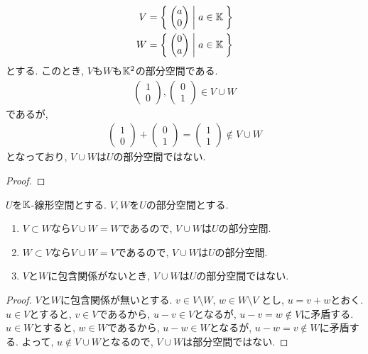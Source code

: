 \begin{example}
  \label{subspace:nonexample:cup}
  \begin{align*}
    V&=\Set{\begin{pmatrix}a\\0\end{pmatrix}|a\in\mathbb{K}}\\
    W&=\Set{\begin{pmatrix}0\\a\end{pmatrix}|a\in\mathbb{K}}
  \end{align*}
  とする.
  このとき, $V$も$W$も$\mathbb{K}^2$の部分空間である.
  \begin{align*}
    \begin{pmatrix}1\\0\end{pmatrix},
    \begin{pmatrix}0\\1\end{pmatrix}\in V\cup W
  \end{align*}
  であるが,
  \begin{align*}
    \begin{pmatrix}1\\0\end{pmatrix}+
    \begin{pmatrix}0\\1\end{pmatrix}=\begin{pmatrix}1\\1\end{pmatrix}\not\in V\cup W
  \end{align*}
  となっており, $V\cup W$は$U$の部分空間ではない.
\end{example}
\begin{proof}\end{proof}

\begin{example}
  $U$を$\mathbb{K}$-線形空間とする.
  $V, W$を$U$の部分空間とする.
  \begin{enumerate}
    \item $V\subset W$なら$V\cup W=W$であるので, $V\cup W$は$U$の部分空間.
    \item $W\subset V$なら$V\cup W=V$であるので, $V\cup W$は$U$の部分空間.
    \item $V$と$W$に包含関係がないとき, $V\cup W$は$U$の部分空間ではない. 
  \end{enumerate}
\end{example}
\begin{proof}
  $V$と$W$に包含関係が無いとする.
  $v\in V\setminus W$, $w\in W\setminus V$
  とし, $u=v+w$とおく.
  $u\in V$とすると, $v\in V$であるから, $u-v\in V$となるが,
  $u-v=w\not\in V$に矛盾する.
  $u\in W$とすると, $w\in W$であるから, $u-w\in W$となるが,
  $u-w=v\not\in W$に矛盾する.
  よって, $u\not\in V\cup W$となるので, $V\cup W$は部分空間ではない.
\end{proof}



